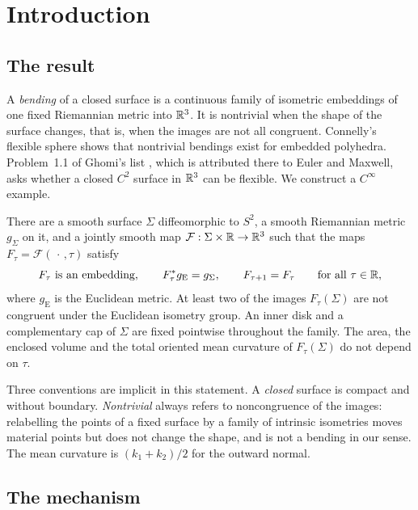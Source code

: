 \section{Introduction}
\label{sec:introduction}

\subsection{The result}

A \emph{bending} of a closed surface is a continuous family of
isometric embeddings of one fixed Riemannian metric into $\mathbb R^3$. It is
nontrivial when the shape of the surface changes, that is, when the
images are not all congruent. Connelly's flexible sphere
\cite{Connelly1977} shows that nontrivial bendings exist for embedded
polyhedra. Problem~1.1 of Ghomi's list \cite{Ghomi2019}, which is
attributed there to Euler and Maxwell, asks whether a closed $C^2$
surface in $\mathbb R^3$ can be flexible. We construct a $C^\infty$ example.

\begin{maintheorem}\label{thm:main}
There are a smooth surface $\Sigma$ diffeomorphic to $S^2$, a smooth
Riemannian metric $g_\Sigma$ on it, and a jointly smooth map
$\mathcal F:\Sigma\times\mathbb R\to\mathbb R^3$ such that the maps
$F_\tau=\mathcal F(\,\cdot\,,\tau)$ satisfy
\[
 F_\tau\text{ is an embedding},\qquad
 F_\tau^*g_{\mathrm E}=g_\Sigma,\qquad F_{\tau+1}=F_\tau
 \qquad\text{for all }\tau\in\mathbb R,
\]
where $g_{\mathrm E}$ is the Euclidean metric. At least two of the
images $F_\tau(\Sigma)$ are not congruent under the Euclidean isometry
group. An inner disk and a complementary cap of $\Sigma$ are fixed
pointwise throughout the family. The area, the enclosed volume and the
total oriented mean curvature of $F_\tau(\Sigma)$ do not depend on
$\tau$.
\end{maintheorem}

Three conventions are implicit in this statement. A \emph{closed}
surface is compact and without boundary. \emph{Nontrivial} always
refers to noncongruence of the images: relabelling the points of a
fixed surface by a family of intrinsic isometries moves material
points but does not change the shape, and is not a bending in our
sense. The mean curvature is $(k_1+k_2)/2$ for the outward normal.

\subsection{The mechanism}
\label{subsec:mechanism}

